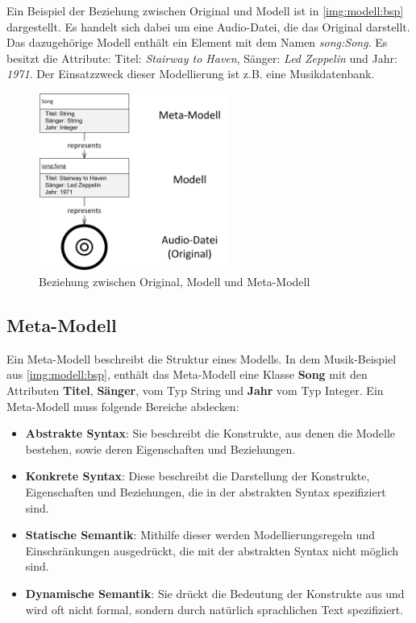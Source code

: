 Ein Beispiel der Beziehung zwischen Original und Modell ist in  \autoref{img:modell:bsp} dargestellt. Es handelt sich dabei um eine Audio-Datei, die das Original darstellt. Das dazugehörige Modell enthält ein Element mit dem Namen \textit{song:Song}. Es besitzt die Attribute: Titel: \textit{Stairway to Haven}, Sänger: \textit{Led Zeppelin} und Jahr: \textit{1971}. Der Einsatzzweck dieser Modellierung ist z.B. eine Musikdatenbank.

\begin{figure}[h]
	\centering
  	\includegraphics[width=0.55\textwidth]{images/modell_bsp.png}
	\caption{Beziehung zwischen Original, Modell und Meta-Modell}
	\label{img:modell:bsp}
\end{figure}

\subsection{Meta-Modell}
\label{sec:metamodell}
Ein Meta-Modell beschreibt die Struktur eines Modells. In dem Musik-Beispiel aus \autoref{img:modell:bsp}, enthält das Meta-Modell eine Klasse \textbf{Song} mit den Attributen \textbf{Titel}, \textbf{Sänger}, vom Typ String und \textbf{Jahr} vom Typ Integer.
Ein Meta-Modell muss folgende Bereiche abdecken:
\begin{itemize}
\item \textbf{Abstrakte Syntax}: Sie beschreibt die Konstrukte, aus denen die Modelle bestehen, sowie deren Eigenschaften und Beziehungen.
\item \textbf{Konkrete Syntax}: Diese beschreibt die Darstellung der Konstrukte, Eigenschaften und Beziehungen, die in der abstrakten Syntax spezifiziert sind.
\item \textbf{Statische Semantik}: Mithilfe dieser werden Modellierungsregeln und Einschränkungen ausgedrückt, die mit der abstrakten Syntax nicht möglich sind.
\item \textbf{Dynamische Semantik}: Sie drückt die Bedeutung der Konstrukte aus und wird oft nicht formal, sondern durch natürlich sprachlichen Text spezifiziert.
\end{itemize}

